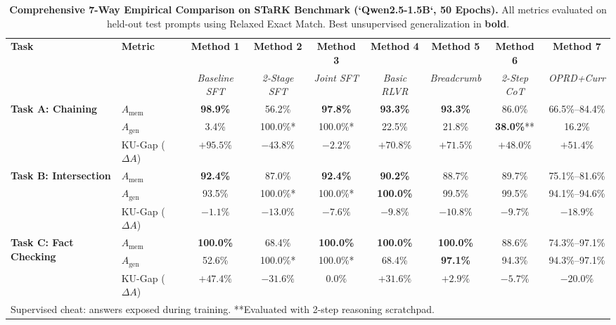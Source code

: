 \documentclass[11pt]{article}
\newcommand{\Amem}{A_{\text{mem}}}
\newcommand{\Agen}{A_{\text{gen}}}
\theoremstyle{definition}
\begin{document}
\begin{table}[t]
\centering
\small
\setlength{\tabcolsep}{4.5pt}
\caption{\textbf{Comprehensive 7-Way Empirical Comparison on STaRK Benchmark (`Qwen2.5-1.5B`, 50 Epochs).} All metrics evaluated on held-out test prompts using Relaxed Exact Match. Best unsupervised generalization in \textbf{bold}.}
\label{tab:main_results}
\begin{tabular}{llccccccc}
\toprule
\textbf{Task} & \textbf{Metric} & \textbf{Method 1} & \textbf{Method 2} & \textbf{Method 3} & \textbf{Method 4} & \textbf{Method 5} & \textbf{Method 6} & \textbf{Method 7} \\
 & & \textit{Baseline SFT} & \textit{2-Stage SFT} & \textit{Joint SFT} & \textit{Basic RLVR} & \textit{Breadcrumb} & \textit{2-Step CoT} & \textit{OPRD+Curr} \\
\midrule
\multirow{3}{*}{\textbf{Task A: Chaining}} 
 & $\Amem$ & \textbf{98.9\%} & 56.2\% & \textbf{97.8\%} & \textbf{93.3\%} & \textbf{93.3\%} & 86.0\% & 66.5\%--84.4\% \\
 & $\Agen$ & 3.4\% & 100.0\%* & 100.0\%* & 22.5\% & 21.8\% & \textbf{38.0\%}** & 16.2\% \\
 & KU-Gap ($\Delta A$) & $+95.5\%$ & $-43.8\%$ & $-2.2\%$ & $+70.8\%$ & $+71.5\%$ & $\mathbf{+48.0\%}$ & $+51.4\%$ \\
\midrule
\multirow{3}{*}{\textbf{Task B: Intersection}} 
 & $\Amem$ & \textbf{92.4\%} & 87.0\% & \textbf{92.4\%} & \textbf{90.2\%} & 88.7\% & 89.7\% & 75.1\%--81.6\% \\
 & $\Agen$ & 93.5\% & 100.0\%* & 100.0\%* & \textbf{100.0\%} & 99.5\% & 99.5\% & 94.1\%--94.6\% \\
 & KU-Gap ($\Delta A$) & $-1.1\%$ & $-13.0\%$ & $-7.6\%$ & $\mathbf{-9.8\%}$ & $-10.8\%$ & $-9.7\%$ & $-18.9\%$ \\
\midrule
\multirow{3}{*}{\textbf{Task C: Fact Checking}} 
 & $\Amem$ & \textbf{100.0\%} & 68.4\% & \textbf{100.0\%} & \textbf{100.0\%} & \textbf{100.0\%} & 88.6\% & 74.3\%--97.1\% \\
 & $\Agen$ & 52.6\% & 100.0\%* & 100.0\%* & 68.4\% & \textbf{97.1\%} & 94.3\% & 94.3\%--97.1\% \\
 & KU-Gap ($\Delta A$) & $+47.4\%$ & $-31.6\%$ & $0.0\%$ & $+31.6\%$ & $\mathbf{+2.9\%}$ & $\mathbf{-5.7\%}$ & $\mathbf{-20.0\%}$ \\
\bottomrule
\multicolumn{9}{l}{\footnotesize *Supervised cheat: answers exposed during training. **Evaluated with 2-step reasoning scratchpad.}
\end{tabular}
\end{table}
\end{document}
